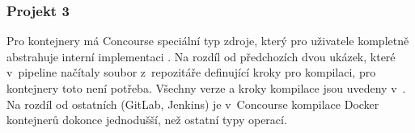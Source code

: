        \subsubsection{Projekt 3}
            Pro kontejnery má Concourse speciální typ zdroje, který pro uživatele kompletně abstrahuje interní implementaci . Na rozdíl od předchozích dvou ukázek, které v~pipeline načítaly soubor z~repozitáře definující kroky pro kompilaci, pro kontejnery toto není potřeba. Všechny verze a kroky kompilace jsou uvedeny v~. Na rozdíl od ostatních \CI (GitLab, Jenkins) je v~Concourse kompilace Docker kontejnerů dokonce jednodušší, než ostatní typy operací.

